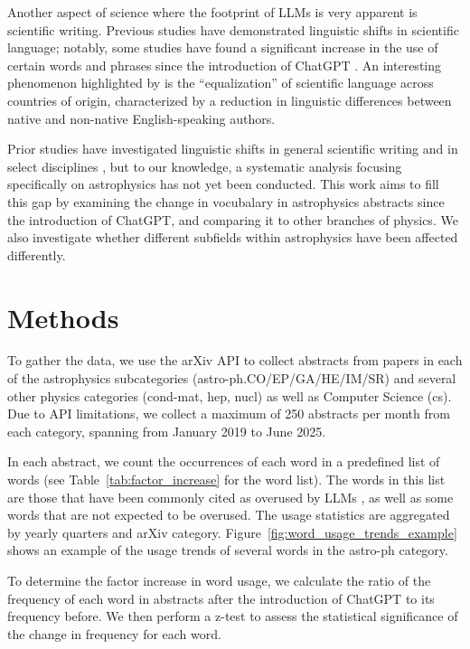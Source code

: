 \documentclass[twocolumn]{aastex701}
\begin{document}
Another aspect of science where the footprint of LLMs is very apparent is scientific writing.
Previous studies have demonstrated linguistic shifts in scientific language;
notably, some studies have found a significant increase in the use of certain words and phrases since the introduction of ChatGPT \citep{Kobak2025,Bao2025,Juzek2024}.
An interesting phenomenon highlighted by \citet{Lin2025} is the ``equalization'' of scientific language across countries of origin, characterized by a reduction in linguistic differences between native and non-native English-speaking authors.

Prior studies have investigated linguistic shifts in general scientific writing and in select disciplines \citep{Xu2024,Kobak2025,Bao2025}, but to our knowledge, a systematic analysis focusing specifically on astrophysics has not yet been conducted.
This work aims to fill this gap by examining the change in vocubalary in astrophysics abstracts since the introduction of ChatGPT, and comparing it to other branches of physics.
We also investigate whether different subfields within astrophysics have been affected differently.


\section{Methods}

To gather the data, we use the arXiv API to collect abstracts from papers in each of the astrophysics subcategories (astro-ph.CO/EP/GA/HE/IM/SR) and several other physics categories (cond-mat, hep, nucl) as well as Computer Science (cs).
Due to API limitations, we collect a maximum of 250 abstracts per month from each category, spanning from January 2019 to June 2025.

In each abstract, we count the occurrences of each word in a predefined list of words (see Table~\ref{tab:factor_increase} for the word list).
The words in this list are those that have been commonly cited as overused by LLMs \citep{Bao2025,Kobak2025}, as well as some words that are not expected to be overused.
The usage statistics are aggregated by yearly quarters and arXiv category.
Figure~\ref{fig:word_usage_trends_example} shows an example of the usage trends of several words in the astro-ph category.

To determine the factor increase in word usage, we calculate the ratio of the frequency of each word in abstracts after the introduction of ChatGPT to its frequency before.
We then perform a z-test to assess the statistical significance of the change in frequency for each word.
\end{document}
